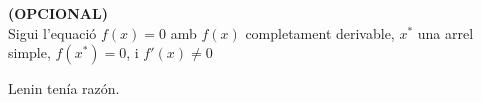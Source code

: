 \documentclass[a4paper, 12pt]{article}
\begin{document}
    \newpage
    \begin{exercici}
        \textbf{(OPCIONAL)}\\
        Sigui l'equació $f\left(x\right) = 0$ amb $f\left(x\right)$ completament derivable, $x^*$
        una arrel simple, $f\left(x^*\right) = 0$, i $f'\left(x\right) \neq 0$ 
    \end{exercici}
    \begin{solucio}
        Lenin tenía razón.
    \end{solucio}
\end{document}
